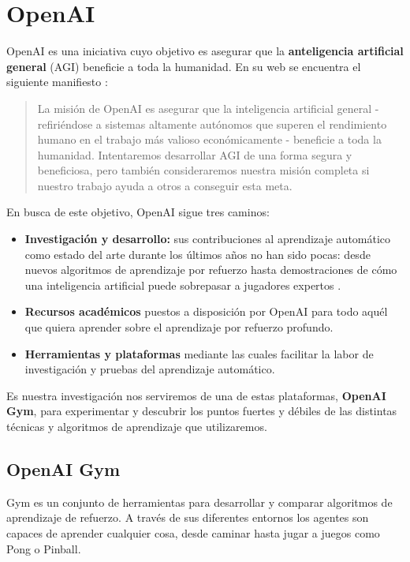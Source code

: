 \section{OpenAI}

OpenAI es una iniciativa cuyo objetivo es asegurar que la \textbf{anteligencia artificial general} (AGI) beneficie a toda la humanidad. En su web se encuentra el siguiente manifiesto \citep{OpenAI_charter}:

\begin{quote}
    La misión de OpenAI es asegurar que la inteligencia artificial general - refiriéndose a sistemas altamente autónomos que superen el rendimiento humano en el trabajo más valioso económicamente - beneficie a toda la humanidad. Intentaremos desarrollar AGI de una forma segura y beneficiosa, pero también consideraremos nuestra misión completa si nuestro trabajo ayuda a otros a conseguir esta meta. 
\end{quote}

En busca de este objetivo, OpenAI sigue tres caminos:
\begin{itemize}
    \item \textbf{Investigación y desarrollo:} sus contribuciones al aprendizaje automático como estado del arte durante los últimos años no han sido pocas: desde nuevos algoritmos de aprendizaje por refuerzo \citep{baselines} hasta demostraciones de cómo una inteligencia artificial puede sobrepasar a jugadores expertos \citep{OpenAI_dota}.
    \item \textbf{Recursos académicos} puestos a disposición por OpenAI \citep{spinningup} para todo aquél que quiera aprender sobre el aprendizaje por refuerzo profundo.
    \item \textbf{Herramientas y plataformas} mediante las cuales facilitar la labor de investigación y pruebas del aprendizaje automático.
\end{itemize}

Es nuestra investigación nos serviremos de una de estas plataformas, \textbf{OpenAI Gym}, para experimentar y descubrir los puntos fuertes y débiles de las distintas técnicas y algoritmos de aprendizaje que utilizaremos.


\subsection{OpenAI Gym}
\label{sec:openai}

Gym es un conjunto de herramientas para desarrollar y comparar algoritmos de aprendizaje de refuerzo. A través de sus diferentes entornos los agentes son capaces de aprender cualquier cosa, desde caminar hasta jugar a juegos como Pong o Pinball.


